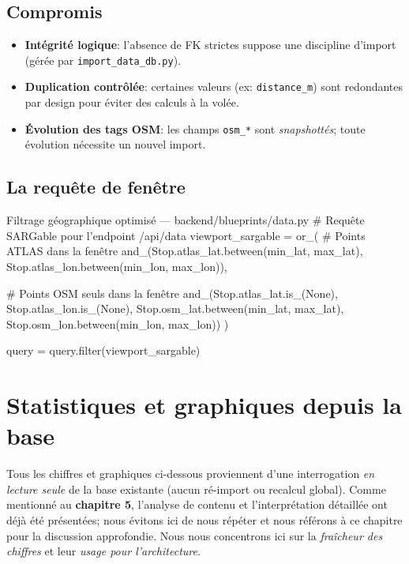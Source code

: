 \subsection*{Compromis}
\begin{itemize}
  \item \textbf{Intégrité logique}: l'absence de FK strictes suppose une discipline d'import (gérée par \texttt{import\_data\_db.py}).
  \item \textbf{Duplication contrôlée}: certaines valeurs (ex: \texttt{distance\_m}) sont redondantes par design pour éviter des calculs à la volée.
  \item \textbf{Évolution des tags OSM}: les champs \texttt{osm\_*} sont \textit{snapshottés}; toute évolution nécessite un nouvel import.
\end{itemize}

\subsection*{La requête de fenêtre}

\begin{codebox}[language=Python]{Filtrage géographique optimisé — backend/blueprints/data.py}
# Requête SARGable pour l'endpoint /api/data
viewport_sargable = or_(
    # Points ATLAS dans la fenêtre
    and_(Stop.atlas_lat.between(min_lat, max_lat),
         Stop.atlas_lon.between(min_lon, max_lon)),
    
    # Points OSM seuls dans la fenêtre  
    and_(Stop.atlas_lat.is_(None), Stop.atlas_lon.is_(None),
         Stop.osm_lat.between(min_lat, max_lat),
         Stop.osm_lon.between(min_lon, max_lon))
)

query = query.filter(viewport_sargable)
\end{codebox}

\section{Statistiques et graphiques depuis la base}
Tous les chiffres et graphiques ci-dessous proviennent d'une interrogation \textit{en lecture seule} de la base existante (aucun ré-import ou recalcul global). Comme mentionné au \textbf{chapitre 5}, l'analyse de contenu et l'interprétation détaillée ont déjà été présentées; nous évitons ici de nous répéter et nous référons à ce chapitre pour la discussion approfondie. Nous nous concentrons ici sur la \textit{fraîcheur des chiffres} et leur \textit{usage pour l'architecture}.

